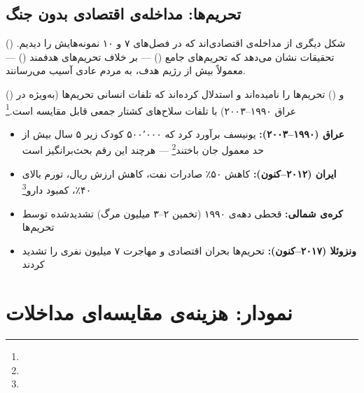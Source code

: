 \subsection{تحریم‌ها: مداخله‌ی اقتصادی بدون جنگ}
\label{subsec:ch12-sanctions}

 () شکل دیگری از مداخله‌ی اقتصادی‌اند که در فصل‌های ۷ و ۱۰ نمونه‌هایش را دیدیم. تحقیقات نشان می‌دهد که تحریم‌های جامع () — بر خلاف تحریم‌های هدفمند () — معمولاً بیش از رژیم هدف، به مردم عادی آسیب می‌رسانند.

 () و  () تحریم‌ها را  نامیده‌اند و استدلال کرده‌اند که تلفات انسانی تحریم‌ها (به‌ویژه در عراق ۱۹۹۰–۲۰۰۳) با تلفات سلاح‌های کشتار جمعی قابل مقایسه است.\footnote{}

\begin{tcolorbox}[enemybox, title={هزینه‌ی انسانی تحریم‌ها: مقایسه}]
\begin{itemize}
\item \textbf{عراق (۱۹۹۰–۲۰۰۳):} یونیسف برآورد کرد که ۵۰۰٬۰۰۰ کودک زیر ۵ سال بیش از حد معمول جان باختند\footnote{} — هرچند این رقم بحث‌برانگیز است
\item \textbf{ایران (۲۰۱۲–کنون):} کاهش ۵۰٪ صادرات نفت، کاهش ارزش ریال، تورم بالای ۴۰٪، کمبود دارو\footnote{}
\item \textbf{کره‌ی شمالی:} قحطی دهه‌ی ۱۹۹۰ (تخمین ۲–۳ میلیون مرگ) تشدیدشده توسط تحریم‌ها
\item \textbf{ونزوئلا (۲۰۱۷–کنون):} تحریم‌ها بحران اقتصادی و مهاجرت ۷ میلیون نفری را تشدید کردند
\end{itemize}
\end{tcolorbox}


\section{نمودار: هزینه‌ی مقایسه‌ای مداخلات}
\label{sec:ch12-pgfplots}

